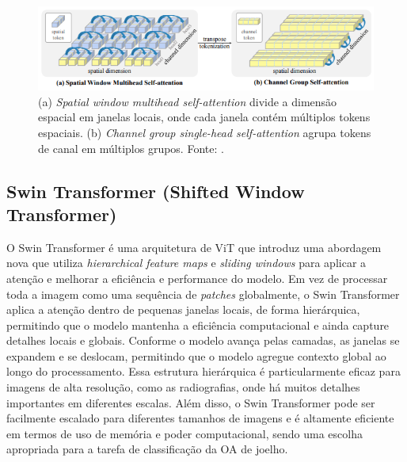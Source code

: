 \begin{figure}
    \centering
    \includegraphics[width=\linewidth]{figs/spatial-and-channel-window-self-attention.png}
    \caption{(a) \textit{Spatial window multihead self-attention} divide a dimensão espacial em janelas locais, onde cada janela contém múltiplos tokens espaciais. (b) \textit{Channel group single-head self-attention} agrupa tokens de canal em múltiplos grupos. Fonte: \cite{ding2022davitdualattentionvision}.}
    \label{fig:spatial-and-channel-window-self-attention}
\end{figure}

\subsection{Swin Transformer (Shifted Window Transformer)}

O Swin Transformer \cite{Liu2021} é uma arquitetura de ViT que introduz uma abordagem nova que utiliza \textit{hierarchical feature maps} e \textit{sliding windows} para aplicar a atenção e melhorar a eficiência e performance do modelo. Em vez de processar toda a imagem como uma sequência de \textit{patches} globalmente, o Swin Transformer aplica a atenção dentro de pequenas janelas locais, de forma hierárquica, permitindo que o modelo mantenha a eficiência computacional e ainda capture detalhes locais e globais. Conforme o modelo avança pelas camadas, as janelas se expandem e se deslocam, permitindo que o modelo agregue contexto global ao longo do processamento. Essa estrutura hierárquica é particularmente eficaz para imagens de alta resolução, como as radiografias, onde há muitos detalhes importantes em diferentes escalas. Além disso, o Swin Transformer pode ser facilmente escalado para diferentes tamanhos de imagens e é altamente eficiente em termos de uso de memória e poder computacional, sendo uma escolha apropriada para a tarefa de classificação da OA de joelho.


